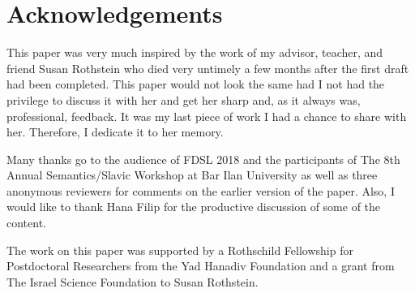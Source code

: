 \documentclass[output=paper,
colorlinks,
citecolor=brown,
newtxmath
]{langscibook}
\begin{document}
\section*{Acknowledgements}
This paper was very much inspired by the work of my advisor, teacher, and friend Susan Rothstein who died very untimely a few months after the first draft had been completed. This paper would not look the same had I not had the privilege to discuss it with her and get her sharp and, as it always was, professional, feedback. It was my last piece of work I had a chance to share with her. Therefore, I dedicate it to her memory.

Many thanks go to the audience of FDSL 2018 and the participants of The 8th Annual Semantics/Slavic Workshop at Bar Ilan University as well as three anonymous reviewers for comments on the earlier version of the paper. Also, I would like to thank Hana Filip for the productive discussion of some of the content.

The work on this paper was supported by a Rothschild Fellowship for Postdoctoral Researchers from the Yad Hanadiv Foundation and a grant from The Israel Science Foundation to Susan Rothstein.

\sloppy
\printbibliography[heading=subbibliography,notkeyword=this]
\end{document}
